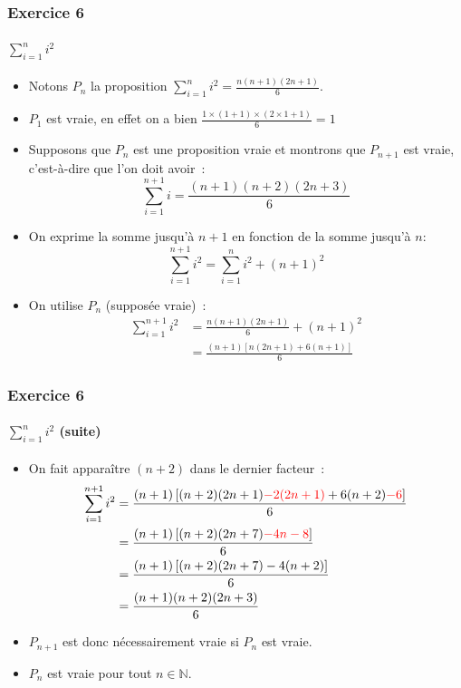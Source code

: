 \documentclass[10pt,notheorems]{beamer}
\newcommand{\red}{\color{red}}
\theoremstyle{plain}
\theoremstyle{definition} %
\begin{document}
\begin{frame}
  \frametitle{Exercice 6}
  \framesubtitle{$\sum_{i=1}^n i^2$}
  \fontsize{8}{10}\selectfont

  \begin{itemize}

  \item Notons $P_n$ la proposition $\sum_{i=1}^n i^2 = \frac{n(n+1)(2n+1)}{6}$.\newline

  \item $P_1$ est vraie, en effet on a bien $\frac{1 \times (1+1) \times (2\times 1 + 1)}{6} = 1$\newline

  \item Supposons que $P_n$ est une proposition vraie et montrons que $P_{n+1}$ est vraie, c'est-à-dire  que l'on doit avoir~:
    \[
      \sum_{i=1}^{n+1} i = \frac{(n+1)(n+2)(2n+3)}{6}
    \]

  \item On exprime la somme jusqu'à $n+1$ en fonction de la somme jusqu'à $n$:
    \[
      \sum_{i=1}^{n+1} i^2 = \sum_{i=1}^{n} i^2 + (n+1)^2
    \]

  \item On utilise $P_n$ (supposée vraie)~:
    \[
      \begin{split}
        \sum_{i=1}^{n+1} i^2 &= \frac{n(n+1)(2n+1)}{6} + (n+1)^2\\
        &= \frac{(n+1)\left[n(2n+1)+6(n+1)\right]}{6}
      \end{split}
    \]

  \end{itemize}

\end{frame}


\begin{frame}
  \frametitle{Exercice 6}
  \framesubtitle{$\sum_{i=1}^n i^2$ (suite)}
  \fontsize{8}{10}\selectfont

  \begin{itemize}

  \item On fait apparaître $(n+2)$ dans le dernier facteur~:
    \[
      \begin{split}
        \sum_{i=1}^{n+1} i^2 &= \frac{(n+1)\left[(n+2)(2n+1){\red -2(2n+1)}+6(n+2){\red-6}\right]}{6}\\
        &= \frac{(n+1)\left[(n+2)(2n+7){\red -4n-8}\right]}{6}\\
        &= \frac{(n+1)\left[(n+2)(2n+7)-4(n+2)\right]}{6}\\
        &= \frac{(n+1)(n+2)(2n+3)}{6}\\
      \end{split}
    \]

  \item $P_{n+1}$ est donc nécessairement vraie si $P_{n}$ est vraie.\newline

  \item $P_n$ est vraie pour tout $n\in\mathbb N$.

  \end{itemize}

\end{frame}
\end{document}
